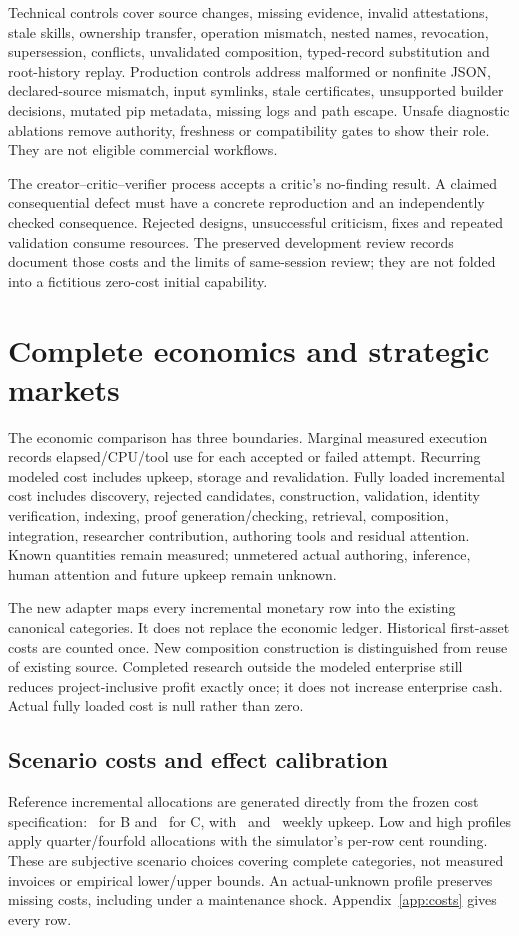 \documentclass[11pt,a4paper]{article}
\begin{document}
Technical controls cover source changes, missing evidence, invalid attestations, stale skills, ownership transfer, operation mismatch, nested names, revocation, supersession, conflicts, unvalidated composition, typed-record substitution and root-history replay. Production controls address malformed or nonfinite JSON, declared-source mismatch, input symlinks, stale certificates, unsupported builder decisions, mutated pip metadata, missing logs and path escape. Unsafe diagnostic ablations remove authority, freshness or compatibility gates to show their role. They are not eligible commercial workflows.

The creator--critic--verifier process accepts a critic's no-finding result. A claimed consequential defect must have a concrete reproduction and an independently checked consequence. Rejected designs, unsuccessful criticism, fixes and repeated validation consume resources. The preserved development review records document those costs and the limits of same-session review; they are not folded into a fictitious zero-cost initial capability.

\section{Complete economics and strategic markets}
\label{sec:economics}
The economic comparison has three boundaries. Marginal measured execution records elapsed/CPU/tool use for each accepted or failed attempt. Recurring modeled cost includes upkeep, storage and revalidation. Fully loaded incremental cost includes discovery, rejected candidates, construction, validation, identity verification, indexing, proof generation/checking, retrieval, composition, integration, researcher contribution, authoring tools and residual attention. Known quantities remain measured; unmetered actual authoring, inference, human attention and future upkeep remain unknown.

The new adapter maps every incremental monetary row into the existing canonical categories. It does not replace the economic ledger. Historical first-asset costs are counted once. New composition construction is distinguished from reuse of existing source. Completed research outside the modeled enterprise still reduces project-inclusive profit exactly once; it does not increase enterprise cash. Actual fully loaded cost is null rather than zero.

\subsection{Scenario costs and effect calibration}
Reference incremental allocations are generated directly from the frozen cost specification: \RegistryOneoff\ for B and \GraphOneoff\ for C, with \RegistryWeekly\ and \GraphWeekly\ weekly upkeep. Low and high profiles apply quarter/fourfold allocations with the simulator's per-row cent rounding. These are subjective scenario choices covering complete categories, not measured invoices or empirical lower/upper bounds. An actual-unknown profile preserves missing costs, including under a maintenance shock. Appendix~\ref{app:costs} gives every row.
\end{document}
